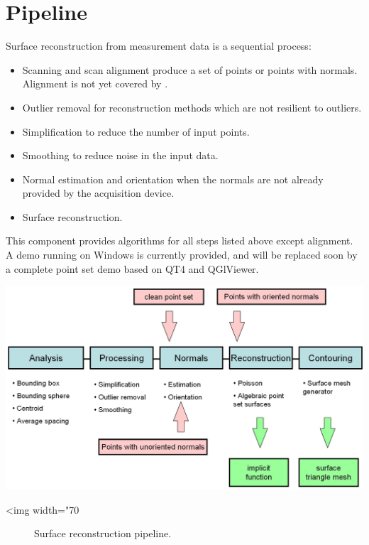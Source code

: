 \section{Pipeline}

Surface reconstruction from measurement data is a sequential process:

\begin{itemize}
\item Scanning and scan alignment produce a set of points
      or points with normals. Alignment is not yet
      covered by \cgal.
\item Outlier removal for reconstruction methods which
      are not resilient to outliers.
\item Simplification to reduce the number of input points.
\item Smoothing to reduce noise in the input data.
\item Normal estimation and orientation when the normals
      are not already provided by the acquisition device.
\item Surface reconstruction.
\end{itemize}

This component provides algorithms for all steps listed above except alignment. A demo running on Windows is currently provided, and will be replaced soon by a complete point set demo based on QT4 and QGlViewer.

\begin{center}
    \label{Surface_reconstruction_3-fig-pipeline}
    \begin{ccTexOnly}
        \includegraphics[width=1.0\textwidth]{Surface_reconstruction_3/pipeline} %
    \end{ccTexOnly}
    \begin{ccHtmlOnly}
        <img width="70%
    \end{ccHtmlOnly}
    \begin{figure}[h]
        \caption{Surface reconstruction pipeline.}
    \end{figure}
\end{center}


